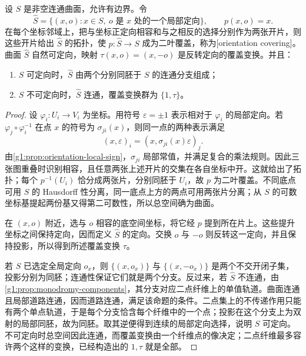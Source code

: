 \begin{theorem}\label{g1:thm:orientation-cover}
	设 \(S\) 是非空连通曲面，允许有边界。令
	\[
		\widehat S=\{(x,o):x\in S,\ o\text{ 是 }x\text{ 处的一个局部定向}\},
		\qquad p(x,o)=x.
	\]
	在每个坐标邻域上，把与坐标正定向相容和与之相反的选择分别作为两张开片，则这些开片给出 \(\widehat S\) 的拓扑，使 \(p:\widehat S\rightarrow S\) 成为二叶覆盖，称为[orientation covering]。曲面 \(\widehat S\) 自然可定向，映射 \(\tau(x,o)=(x,-o)\) 是反转定向的覆盖变换。并且：
	\begin{enumerate}
		\item \(S\) 可定向时，\(\widehat S\) 由两个分别同胚于 \(S\) 的连通分支组成；
		\item \(S\) 不可定向时，\(\widehat S\) 连通，覆盖变换群为 \(\{1,\tau\}\)。
	\end{enumerate}
\end{theorem}
\begin{proof}
	设 \(\varphi_i:U_i\rightarrow V_i\) 为坐标。用符号 \(\varepsilon=\pm1\) 表示相对于 \(\varphi_i\) 的局部定向。若 \(\varphi_j\circ\varphi_i^{-1}\) 在点 \(x\) 的符号为 \(\sigma_{ji}(x)\)，则同一点的两种表示满足
	\[
		(x,\varepsilon)_i=(x,\sigma_{ji}(x)\varepsilon)_j.
	\]
	由\cref{g1:prop:orientation-local-sign}，\(\sigma_{ji}\) 局部常值，并满足复合的乘法规则。因此三张图重叠时识别相容，且任意两张上述开片的交集在各自坐标中开。这就给出了拓扑；每个 \(p^{-1}(U_i)\) 恰分成两张片，分别同胚于 \(U_i\)，故 \(p\) 为二叶覆盖。不同底点可用 \(S\) 的 Hausdorff 性分离，同一底点上方的两点可用两张片分离；从 \(S\) 的可数坐标基提起两份基又得第二可数性，所以总空间确为曲面。

	在 \((x,o)\) 附近，选与 \(o\) 相容的底空间坐标，将它经 \(p\) 提到所在片上。这些提升坐标之间保持定向，因而定义 \(\widehat S\) 的定向。交换 \(o\) 与 \(-o\) 则反转这一定向，并且保持投影，所以得到所述覆盖变换 \(\tau\)。

	若 \(S\) 已选定全局定向 \(o_x\)，则 \(\{(x,o_x)\}\) 与 \(\{(x,-o_x)\}\) 是两个不交开闭子集，投影分别为同胚；连通性保证它们就是两个分支。反过来，若 \(\widehat S\) 不连通，由\cref{g1:prop:monodromy-components}，其分支对应二点纤维上的单值轨道。曲面连通且局部道路连通，因而道路连通，满足该命题的条件。二点集上的不传递作用只能有两个单点轨道，于是每个分支恰含每个纤维中的一个点；投影在这个分支上为双射的局部同胚，故为同胚。取其逆便得到连续的局部定向选择，说明 \(S\) 可定向。不可定向时总空间因此连通，而覆盖变换由一个纤维点的像决定；二点纤维最多容许两个这样的变换，已经构造出的 \(1,\tau\) 就是全部。
\end{proof}

